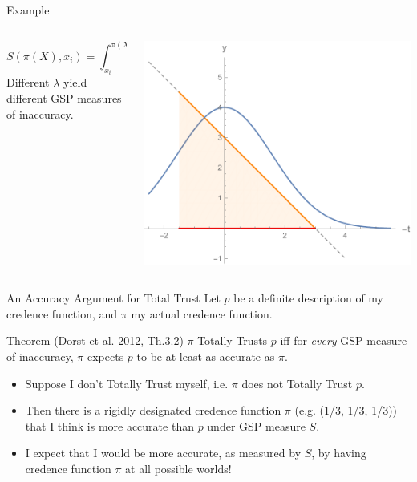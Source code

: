\documentclass[aspectratio=169, dvipsnames]{beamer}
\begin{document}
\begin{frame}{Example}
  \begin{columns}
    \begin{column}{.4\linewidth}
      \begin{equation*}
        S(\pi(X), x_i) = \int_{x_i}^{\pi(X)}-(x_i - t)\lambda(dt)
      \end{equation*}
      Different $\lambda$ yield different GSP measures of inaccuracy.
    \end{column}
    \begin{column}{.58\linewidth}
      \begin{center}
      \includegraphics[width=1.05\textwidth]{GSP2.pdf}
      \end{center}
    \end{column}
  \end{columns}
\end{frame}

\begin{frame}{An Accuracy Argument for Total Trust}
  Let $p$ be a definite description of my credence function, and $\pi$ my actual credence function.
  \begin{block}{Theorem (Dorst et al. 2012, Th.3.2)}
    $\pi$ Totally Trusts $p$ iff for \textit{every} GSP measure of inaccuracy, $\pi$ expects $p$ to be at least as accurate
    as $\pi$. 
  \end{block}
  \begin{itemize}
  \item Suppose I don't Totally Trust myself, i.e. $\pi$ does not Totally Trust $p$.
  \item Then there is a rigidly designated credence function $\pi$ (e.g. (1/3, 1/3, 1/3)) that I think is more accurate
    than $p$ under GSP measure $S$.
  \item I expect that I would be more accurate, as measured by $S$, by having credence function $\pi$ at all possible worlds!
  \end{itemize}
\end{frame}
\end{document}
